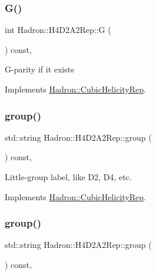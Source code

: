 \subsubsection{\texorpdfstring{G()}{G()}\hspace{0.1cm}{\footnotesize\ttfamily [3/3]}}
{\footnotesize\ttfamily int Hadron\+::\+H4\+D2\+A2\+Rep\+::G (\begin{DoxyParamCaption}{ }\end{DoxyParamCaption}) const\hspace{0.3cm}{\ttfamily [inline]}, {\ttfamily [virtual]}}

G-\/parity if it exists 

Implements \mbox{\hyperlink{structHadron_1_1CubicHelicityRep_a50689f42be1e6170aa8cf6ad0597018b}{Hadron\+::\+Cubic\+Helicity\+Rep}}.

\mbox{\label{structHadron_1_1H4D2A2Rep_aa2ecad1777dd00c1a36199688495a9ac}} 
\subsubsection{\texorpdfstring{group()}{group()}\hspace{0.1cm}{\footnotesize\ttfamily [1/5]}}
{\footnotesize\ttfamily std\+::string Hadron\+::\+H4\+D2\+A2\+Rep\+::group (\begin{DoxyParamCaption}{ }\end{DoxyParamCaption}) const\hspace{0.3cm}{\ttfamily [inline]}, {\ttfamily [virtual]}}

Little-\/group label, like D2, D4, etc. 

Implements \mbox{\hyperlink{structHadron_1_1CubicHelicityRep_a101a7d76cd8ccdad0f272db44b766113}{Hadron\+::\+Cubic\+Helicity\+Rep}}.

\mbox{\label{structHadron_1_1H4D2A2Rep_aa2ecad1777dd00c1a36199688495a9ac}} 
\subsubsection{\texorpdfstring{group()}{group()}\hspace{0.1cm}{\footnotesize\ttfamily [2/5]}}
{\footnotesize\ttfamily std\+::string Hadron\+::\+H4\+D2\+A2\+Rep\+::group (\begin{DoxyParamCaption}{ }\end{DoxyParamCaption}) const\hspace{0.3cm}{\ttfamily [inline]}, {\ttfamily [virtual]}}

